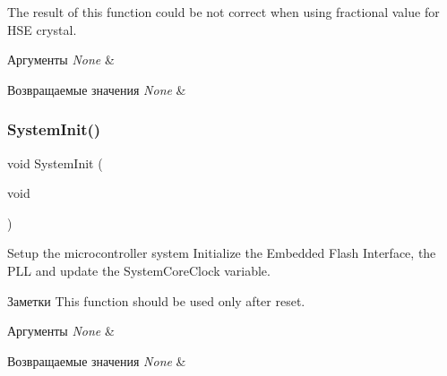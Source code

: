 \begin{DoxyItemize}
\item The result of this function could be not correct when using fractional value for H\+SE crystal. 
\begin{DoxyParams}{Аргументы}
{\em None} & \\
\hline
\end{DoxyParams}

\begin{DoxyRetVals}{Возвращаемые значения}
{\em None} & \\
\hline
\end{DoxyRetVals}

\end{DoxyItemize}\mbox{\label{group___s_t_m32_f10x___system___private___functions_ga93f514700ccf00d08dbdcff7f1224eb2}} 
\subsubsection{\texorpdfstring{SystemInit()}{SystemInit()}}
{\footnotesize\ttfamily void System\+Init (\begin{DoxyParamCaption}\item[{void}]{ }\end{DoxyParamCaption})}



Setup the microcontroller system Initialize the Embedded Flash Interface, the P\+LL and update the System\+Core\+Clock variable. 

\begin{DoxyNote}{Заметки}
This function should be used only after reset. 
\end{DoxyNote}

\begin{DoxyParams}{Аргументы}
{\em None} & \\
\hline
\end{DoxyParams}

\begin{DoxyRetVals}{Возвращаемые значения}
{\em None} & \\
\hline
\end{DoxyRetVals}
